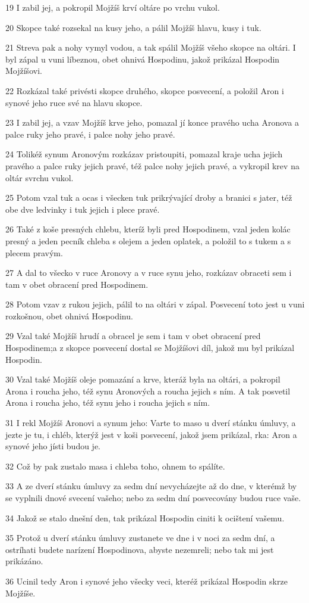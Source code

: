 \par 19 I zabil jej, a pokropil Mojžíš krví oltáre po vrchu vukol.
\par 20 Skopce také rozsekal na kusy jeho, a pálil Mojžíš hlavu, kusy i tuk.
\par 21 Streva pak a nohy vymyl vodou, a tak spálil Mojžíš všeho skopce na oltári. I byl zápal u vuni líbeznou, obet ohnivá Hospodinu, jakož prikázal Hospodin Mojžíšovi.
\par 22 Rozkázal také privésti skopce druhého, skopce posvecení, a položil Aron i synové jeho ruce své na hlavu skopce.
\par 23 I zabil jej, a vzav Mojžíš krve jeho, pomazal jí konce pravého ucha Aronova a palce ruky jeho pravé, i palce nohy jeho pravé.
\par 24 Tolikéž synum Aronovým rozkázav pristoupiti, pomazal kraje ucha jejich pravého a palce ruky jejich pravé, též palce nohy jejich pravé, a vykropil krev na oltár svrchu vukol.
\par 25 Potom vzal tuk a ocas i všecken tuk prikrývající droby a branici s jater, též obe dve ledvinky i tuk jejich i plece pravé.
\par 26 Také z koše presných chlebu, kteríž byli pred Hospodinem, vzal jeden kolác presný a jeden pecník chleba s olejem a jeden oplatek, a položil to s tukem a s plecem pravým.
\par 27 A dal to všecko v ruce Aronovy a v ruce synu jeho, rozkázav obraceti sem i tam v obet obracení pred Hospodinem.
\par 28 Potom vzav z rukou jejich, pálil to na oltári v zápal. Posvecení toto jest u vuni rozkošnou, obet ohnivá Hospodinu.
\par 29 Vzal také Mojžíš hrudí a obracel je sem i tam v obet obracení pred Hospodinem;a z skopce posvecení dostal se Mojžíšovi díl, jakož mu byl prikázal Hospodin.
\par 30 Vzal také Mojžíš oleje pomazání a krve, kteráž byla na oltári, a pokropil Arona i roucha jeho, též synu Aronových a roucha jejich s ním. A tak posvetil Arona i roucha jeho, též synu jeho i roucha jejich s ním.
\par 31 I rekl Mojžíš Aronovi a synum jeho: Varte to maso u dverí stánku úmluvy, a jezte je tu, i chléb, kterýž jest v koši posvecení, jakož jsem prikázal, rka: Aron a synové jeho jísti budou je.
\par 32 Což by pak zustalo masa i chleba toho, ohnem to spálíte.
\par 33 A ze dverí stánku úmluvy za sedm dní nevycházejte až do dne, v kterémž by se vyplnili dnové svecení vašeho; nebo za sedm dní posvecovány budou ruce vaše.
\par 34 Jakož se stalo dnešní den, tak prikázal Hospodin ciniti k ocištení vašemu.
\par 35 Protož u dverí stánku úmluvy zustanete ve dne i v noci za sedm dní, a ostríhati budete narízení Hospodinova, abyste nezemreli; nebo tak mi jest prikázáno.
\par 36 Ucinil tedy Aron i synové jeho všecky veci, kteréž prikázal Hospodin skrze Mojžíše.

